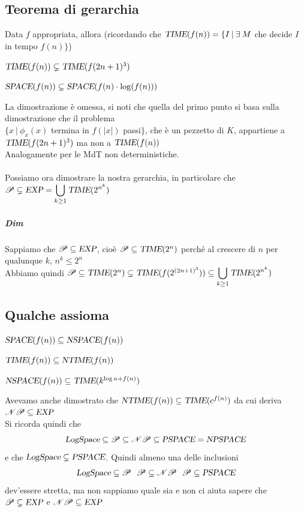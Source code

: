 \documentclass[10pt]{book}
\begin{document}
\subsection{Teorema di gerarchia}
Data $f$ appropriata, allora (ricordando che $\textsl{TIME}(f(n))=\{I\:|\:\exists\:M$ che decide $I$ in tempo $f(n)\}$)
\begin{list}{}{}
	\item $\textsl{TIME}(f(n))\subsetneq\textsl{TIME}(f(2n + 1)^3)$
	\item $\textsl{SPACE}(f(n))\subsetneq\textsl{SPACE}(f(n)\cdot\log(f(n)))$
\end{list}
La dimostrazione è omessa, si noti che quella del primo punto si basa sulla dimostrazione che il problema\\$\{x\:|\:\phi_x(x)$ termina in $f(|x|)$ passi$\}$, che è un pezzetto di $K$, appartiene a $\textsl{TIME}(f(2n+1)^3)$ ma non a $\textsl{TIME}(f(n))$\\
Analogamente per le MdT non deterministiche.
\paragraph{} Possiamo ora dimostrare la nostra gerarchia, in particolare che $\mathscr{P} \subsetneq \textsl{EXP} = \mathlarger{\bigcup_{k \geq 1}\textsl{TIME}(2^{n^k})}$
\subparagraph{Dim} Sappiamo che $\mathscr{P} \subseteq \textsl{EXP}$, cioè $\mathscr{P} \subseteq \textsl{TIME}(2^n)$ perché al crescere di $n$ per qualunque $k$, $n^k \leq 2^n$\\
Abbiamo quindi $\mathscr{P} \subseteq \textsl{TIME}(2^n) \subsetneq\textsl{TIME}(f(2^{(2n + 1)^3})) \subseteq \mathlarger{\bigcup_{k \geq 1}\textsl{TIME}(2^{n^k})}$
\subsection{Qualche assioma}
\begin{list}{-}{}
	\item $\textsl{SPACE}(f(n))\subseteq\textsl{NSPACE}(f(n))$
	\item $\textsl{TIME}(f(n))\subseteq\textsl{NTIME}(f(n))$
	\item $\textsl{NSPACE}(f(n))\subseteq\textsl{TIME}(k^{\log n + f(n)})$
\end{list}
Avevamo anche dimostrato che $\textsl{NTIME}(f(n)) \subseteq \textsl{TIME}(c^{f(n)})$ da cui deriva $\mathscr{NP} \subseteq \textsl{EXP}$\\
Si ricorda quindi che
$$\textsl{LogSpace} \subseteq \mathscr{P} \subseteq \mathscr{NP} \subseteq \textsl{PSPACE} = \textsl{NPSPACE}$$
e che $\textsl{LogSpace} \subsetneq \textsl{PSPACE}$. Quindi almeno una delle inclusioni $$\textsl{LogSpace} \subseteq \mathscr{P}\:\:\:\mathscr{P} \subseteq \mathscr{NP}\:\:\:\mathscr{P} \subseteq \textsl{PSPACE}$$ dev'essere stretta, ma non sappiamo quale sia e non ci aiuta sapere che $\mathscr{P}\subsetneq\textsl{EXP}$ e $\mathscr{NP}\subseteq\textsl{EXP}$
\pagebreak
\end{document}
